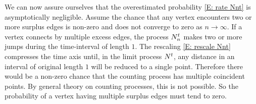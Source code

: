 We can now assure ourselves that the overestimated probability \eqref{E: rate Nnt} is asymptotically negligible.
Assume the chance that any vertex encounters two or more surplus edges is non-zero and does not converge to zero as $n \rightarrow \infty$.
If a vertex connects by multiple excess edges, the process $N_n^t$ makes two or more jumps during the time-interval of length $1$.
The rescaling \eqref{E: rescale Nnt} compresses the time axis until, in the limit process $N^t$, 
any distance in an interval of original length $1$ will be reduced to a single point.
Therefore there would be a non-zero chance that the counting process has multiple coincident points.
By general theory on counting processes, this is not possible.
So the probability of a vertex having multiple surplus edges must tend to zero.

















